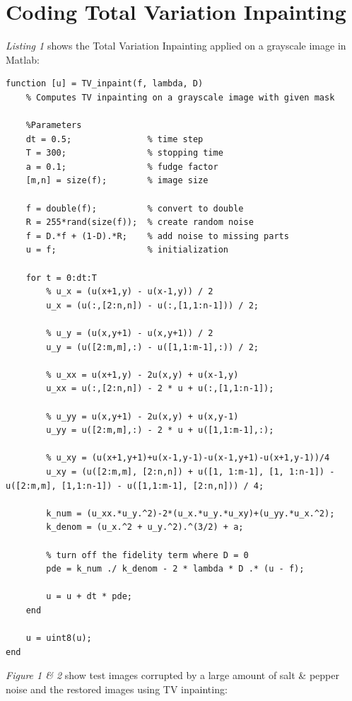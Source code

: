 \documentclass[a4paper,11pt]{article}
\begin{document}
\section*{Coding Total Variation Inpainting}
\emph{Listing 1} shows the  Total Variation Inpainting applied on a grayscale image in Matlab: \\
\begin{lstlisting}[caption={Total Variation Inpainting function on grayscale images in Matlab},captionpos=b,style=Matlab-editor]
function [u] = TV_inpaint(f, lambda, D)
    % Computes TV inpainting on a grayscale image with given mask

    %Parameters
    dt = 0.5;               % time step
    T = 300;                % stopping time
    a = 0.1;                % fudge factor
    [m,n] = size(f);        % image size

    f = double(f);          % convert to double
    R = 255*rand(size(f));  % create random noise
    f = D.*f + (1-D).*R;    % add noise to missing parts
    u = f;                  % initialization

    for t = 0:dt:T
        % u_x = (u(x+1,y) - u(x-1,y)) / 2
        u_x = (u(:,[2:n,n]) - u(:,[1,1:n-1])) / 2;

        % u_y = (u(x,y+1) - u(x,y+1)) / 2
        u_y = (u([2:m,m],:) - u([1,1:m-1],:)) / 2;

        % u_xx = u(x+1,y) - 2u(x,y) + u(x-1,y)
        u_xx = u(:,[2:n,n]) - 2 * u + u(:,[1,1:n-1]);

        % u_yy = u(x,y+1) - 2u(x,y) + u(x,y-1)
        u_yy = u([2:m,m],:) - 2 * u + u([1,1:m-1],:);

        % u_xy = (u(x+1,y+1)+u(x-1,y-1)-u(x-1,y+1)-u(x+1,y-1))/4
        u_xy = (u([2:m,m], [2:n,n]) + u([1, 1:m-1], [1, 1:n-1]) - u([2:m,m], [1,1:n-1]) - u([1,1:m-1], [2:n,n])) / 4;

        k_num = (u_xx.*u_y.^2)-2*(u_x.*u_y.*u_xy)+(u_yy.*u_x.^2);
        k_denom = (u_x.^2 + u_y.^2).^(3/2) + a;

        % turn off the fidelity term where D = 0
        pde = k_num ./ k_denom - 2 * lambda * D .* (u - f);

        u = u + dt * pde;
    end

    u = uint8(u);
end

\end{lstlisting}

\newpage

\emph{Figure 1 \& 2} show test images corrupted by a large amount of salt \& pepper noise and the restored images using TV inpainting:
\end{document}
